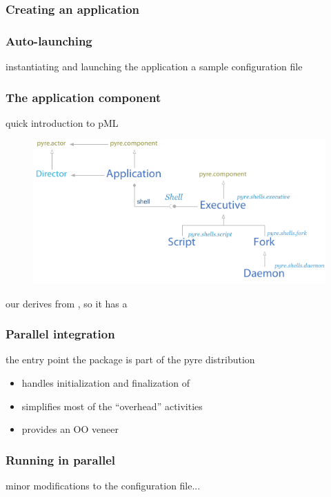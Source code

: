%
%


\begin{frame}[fragile]
%
  \frametitle{Creating an application}
%
%
\end{frame}

\begin{frame}[fragile]
%
  \frametitle{Auto-launching}
%
  instantiating and launching the application
%
%
  a sample configuration file
%
%
\end{frame}

\begin{frame}[fragile]
%
  \frametitle{The application component}
%
  quick introduction to pML 
%
  \begin{figure}
    \includegraphics[scale=1.0]{figures/pyre-shells.pdf}
  \end{figure}
%
  our  derives from , so it has a 
%
\end{frame}

\begin{frame}[fragile]
%
  \frametitle{Parallel integration}
%
  the  entry point
%
%
  the  package is part of the pyre distribution
  \begin{itemize}
  \item handles initialization and finalization of 
  \item simplifies most of the ``overhead'' activities
  \item provides an OO veneer
  \end{itemize}
%
\end{frame}

\begin{frame}[fragile]
%
  \frametitle{Running in parallel}
%
  minor modifications to the configuration file...
%
%
\end{frame}

